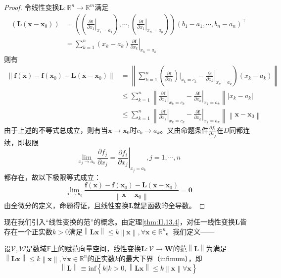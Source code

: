 \documentclass[main.tex]{subfiles}
\begin{document}
\begin{proof}
令线性变换$\mathbf{L}:\mathbb{R}^n\rightarrow \mathbb{R}^m$满足
\begin{align*}
\left(\mathbf{L}\left(\mathbf{x}-\mathbf{x}_0\right)\right)&=\left(\left(\left.\frac{\partial \mathbf{f}}{\partial x_1}\right|_{x_1=a_1}\right),\cdots,\left(\left.\frac{\partial \mathbf{f}}{\partial x_1}\right|_{x_n=a_n}\right)\right)\left(b_1-a_1,\cdots,b_n-a_n\right)^\intercal\\
&=\sum_{k=1}^n\left(x_k-a_k\right)\left.\frac{\partial \mathbf{f}}{\partial x_k}\right|_{x_k=a_k}
\end{align*}
则有
\begin{align*}
    \left\|\mathbf{f}\left(\mathbf{x}\right)-\mathbf{f}\left(\mathbf{x}_0\right)-\mathbf{L}\left(\mathbf{x}-\mathbf{x}_0\right)\right\|&=\left\|\sum_{k=1}^n\left(\left.\frac{\partial \mathbf{f}}{\partial x_k}\right)|_{x_k=c_k}-\left.\frac{\partial \mathbf{f}}{\partial x_k}\right|_{x_k=a_k}\right)\left(x_k-a_k\right)\right\|\\
    &\leq\sum_{k=1}^n\left\|\left.\frac{\partial \mathbf{f}}{\partial x_k}\right|_{x_k=c_k}-\left.\frac{\partial\mathbf{f}}{\partial x_k}\right|_{x_k=a_k}\right\|\left|x_k-a_k\right|\\
    &\leq\sum_{k=1}^n\left\|\left.\frac{\partial\mathbf{f}}{\partial x_k}\right|_{x_k=c_k}-\left.\frac{\partial\mathbf{f}}{\partial x_k}\right|_{x_k=a_k}\right\|\left\|\mathbf{x}-\mathbf{x}_0\right\|
\end{align*}
由于上述的不等式总成立，则有当$\mathbf{x}\to\mathbf{x}_0$时$c_k\to a_k$。又由命题条件$\frac{\partial f_i}{\partial x_j}$在$D$同都连续，即极限
\[
\lim_{x_j\to a_k}\frac{\partial f_j}{\partial x_j}=\left.\frac{\partial f_i}{\partial x_j}\right|_{x_j=a_k},j=1,\cdots,n
\]
都存在，故以下极限等式成立：
\[\lim_{\mathbf{x}\to\mathbf{x}_0}\frac{\mathbf{f}\left(\mathbf{x}\right)-\mathbf{f}\left(\mathbf{x}_0\right)-\mathbf{L}\left(\mathbf{x}-\mathbf{x}_0\right)}{\left\|\mathbf{x}-\mathbf{x}_0\right\|}=\mathbf{0}
\]
由全微分的定义，命题得证，且线性变换$\mathbf{L}$就是函数的全导数。
\end{proof}

现在我们引入“线性变换的范”的概念。由定理\ref{thm:II.13.4}，对任一线性变换$\mathbf{L}$皆存在一个正实数$k>0$满足$\left\|\mathbf{Lx}\right\|\leq k\left\|\mathbf{x}\right\|,\forall\mathbf{x}\in\mathbb{R}^n$。我们定义——

\begin{definition}[线性变换的范]
设$\mathcal{V},\mathcal{W}$是数域$\mathbb{F}$上的赋范向量空间，线性变换$\mathbf{L}:\mathcal{V}\rightarrow\mathbf{W}$的范$\left\|\mathbf{L}\right\|$为满足$\left\|\mathbf{Lx}\right\|\leq k\left\|\mathbf{x}\right\|,\forall\mathbf{x}\in\mathbb{R}^n$的正实数$k$的最大下界（infimum），即
\[\left\|\mathbf{L}\right\|\equiv\mathrm{inf}\left\{k|k>0,\left\|\mathbf{Lx}\right\|\leq k\left\|\mathbf{x}\right\|\forall\mathbf{x}\right\}\]
\end{definition}
\end{document}
